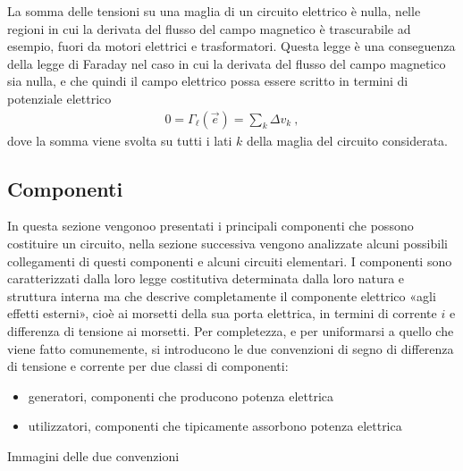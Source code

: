 \documentclass[letterpaper,10pt,italian]{jupyterBook}
\begin{document}
\sphinxAtStartPar
{} La somma delle tensioni su una maglia di un circuito elettrico è nulla, nelle regioni in cui la derivata del flusso del campo magnetico è trascurabile \sphinxhyphen{} ad esempio, fuori da motori elettrici e trasformatori. Questa legge è una conseguenza della legge di Faraday nel caso in cui la derivata del flusso del campo magnetico sia nulla, e che quindi il campo elettrico possa essere scritto in termini di potenziale elettrico
\begin{equation*}
\begin{split}0 = \Gamma_{\ell}(\vec{e}) = \sum_{k} \Delta v_k \ ,\end{split}
\end{equation*}
\sphinxAtStartPar
dove la somma viene svolta su tutti i lati \(k\) della maglia del circuito considerata.


\subsection{Componenti}
\label{\detokenize{ch/electromagnetism/circuits-electric:componenti}}\label{\detokenize{ch/electromagnetism/circuits-electric:physics-hs-electromagnetism-circuits-electric-components}}
\sphinxAtStartPar
In questa sezione vengonoo presentati i principali componenti che possono costituire un circuito, nella sezione successiva vengono analizzate alcuni possibili collegamenti di questi componenti e alcuni circuiti elementari.
I componenti sono caratterizzati dalla loro legge costitutiva \sphinxhyphen{} determinata dalla loro natura e struttura interna \sphinxhyphen{} ma che descrive completamente il componente elettrico «agli effetti esterni», cioè ai morsetti della sua porta elettrica, in termini di corrente \(i\) e differenza di tensione ai morsetti. Per completezza, e per uniformarsi a quello che viene fatto comunemente, si introducono le due convenzioni di segno di differenza di tensione e corrente per due classi di componenti:
\begin{itemize}
\item {} 
\sphinxAtStartPar
generatori, componenti che producono potenza elettrica

\item {} 
\sphinxAtStartPar
utilizzatori, componenti che \sphinxhyphen{} tipicamente \sphinxhyphen{} assorbono potenza elettrica

\end{itemize}

\sphinxAtStartPar
{} Immagini delle due convenzioni
\end{document}
